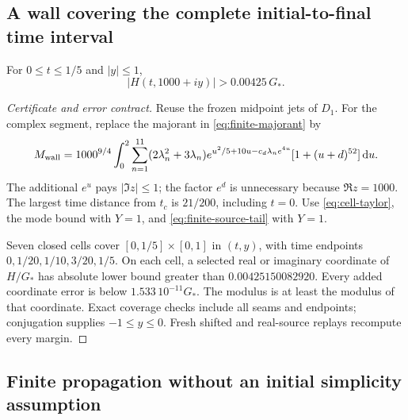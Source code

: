 \subsection{A wall covering the complete initial-to-final time interval}

\begin{proposition}\label{prop:wall}
For $0\le t\le1/5$ and $|y|\le1$,
\begin{equation}\label{eq:wall}
 |H(t,1000+iy)|>0.00425\,G_*.
\end{equation}
\end{proposition}
\begin{proof}[Certificate and error contract]
Reuse the frozen midpoint jets of $D_1$. For the complex segment,
replace the majorant in \eqref{eq:finite-majorant} by
\[
 M_{\rm wall}=1000^{9/4}\int_0^2
 \sum_{n=1}^{11}(2\lambda_n^2+3\lambda_n)
 e^{u^2/5+10u-c_d\lambda_ne^{4u}}[1+(u+d)^{52}]\,\mathrm d u.
\]
The additional $e^u$ pays $|\Im z|\le1$; the factor $e^d$
is unnecessary because $\Re z=1000$. The largest time distance
from $t_c$ is $21/200$, including $t=0$. Use
\eqref{eq:cell-taylor}, the mode bound with $Y=1$, and
\eqref{eq:finite-source-tail} with $Y=1$.

Seven closed cells cover $[0,1/5]\times[0,1]$ in $(t,y)$,
with time endpoints $0,1/20,1/10,3/20,1/5$.
On each cell, a selected real or imaginary coordinate of $H/G_*$
has absolute lower bound greater than $0.00425150082920$.
Every added coordinate error is below $1.533\,10^{-11}G_*$.
The modulus is at least the modulus of that coordinate. Exact coverage
checks include all seams and endpoints; conjugation supplies $-1\le y\le0$.
Fresh shifted and real-source replays recompute every margin.
\end{proof}

\subsection{Finite propagation without an initial simplicity assumption}

